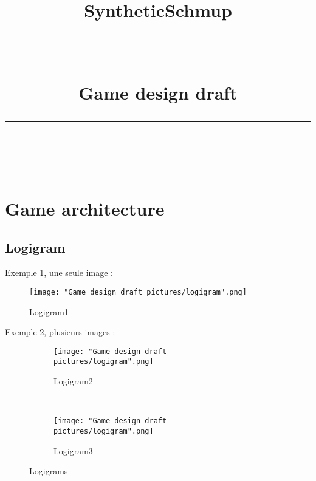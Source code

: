 \documentclass[12pt,a4paper]{article}
\title{ SyntheticSchmup \\
[0.5cm]
\rule{\linewidth}{2pt} \\[0.4cm]
\Huge Game design draft \\
\rule{\linewidth}{2pt}\\
[0.5cm]}
\begin{document}

\makeatletter \begin{center}{\LARGE \@title \par} \@date \end{center} \makeatother


\tableofcontents
\thispagestyle{empty} %
\newpage
\clearpage
\setcounter{page}{1}

\section{Game architecture}
    \subsection{Logigram}
        Exemple 1, une seule image :\\
        \begin{figure}[!h]
	        \center
	        \texttt{[image: "Game design draft pictures/logigram".png]}
	        \caption{Logigram1}
	        \label{Game architecture:Logigram:logigram1}
        \end{figure}
        
        Exemple 2, plusieurs images :\\
        \begin{figure}[!h]
        	\center
        	\begin{subfigure}{0.4\textwidth}
        		\texttt{[image: "Game design draft pictures/logigram".png]}
        		\caption{Logigram2}
        		\label{Game architecture:Logigram:logigram2}
        	\end{subfigure}
        	~~~~
        	\begin{subfigure}{0.4\textwidth}
	        	\texttt{[image: "Game design draft pictures/logigram".png]}
        		\caption{Logigram3}
	        	\label{Game architecture:Logigram:logigram3}
	        \end{subfigure}
	        \caption{Logigrams}
        	\label{Game architecture:Logigram:logigrams}
        \end{figure}
        
\end{document}
